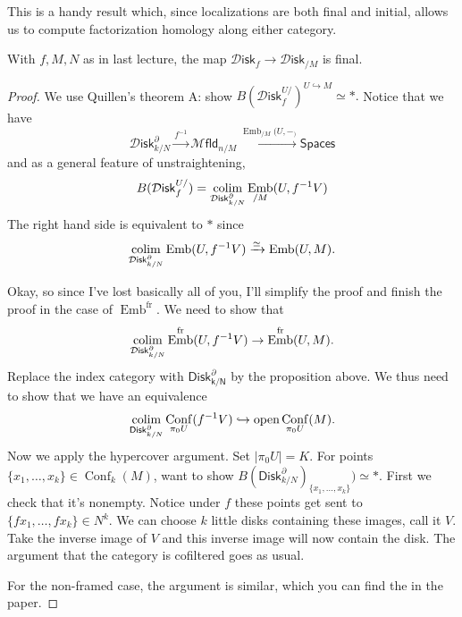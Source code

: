 \documentclass{amsart}
\DeclareMathOperator{\Emb}{Emb}
\DeclareMathOperator{\Conf}{Conf}
\begin{document}
This is a handy result which, since localizations are both final and initial,
allows us to compute factorization homology along either category.
\begin{lemma}[AF 3.21]
    With $f,M,N$ as in last lecture, the map $\mathcal{D}\mathsf{isk}_f\to\mathcal{D}\mathsf{isk}_{/M}$ is final.
\end{lemma}
\begin{proof}
    We use Quillen's theorem A: show $B(\mathcal{D}\mathsf{isk}_f^{U/})^{U\hookrightarrow M}\simeq *.$
    Notice that we have
    \begin{equation*}
        \mathcal{D}\mathsf{isk}_{k/N}^\partial \xrightarrow{f^{-1}} \mathcal{M}\mathsf{fld}_{n/M} \xrightarrow{\Emb_{/M}(U,-_)} \mathsf{Spaces}
    \end{equation*}
    and as a general feature of unstraightening,
    \begin{equation*}
        B(\mathcal{D}\mathsf{isk}_f^{U/}) = \colim_{\mathcal{D}\mathsf{isk}_{k/N}^\partial} \Emb_{/M}(U, f^{-1}V)
    \end{equation*}
    The right hand side is equivalent to $*$ since
    \begin{equation*}
        \colim_{\mathcal{D}\mathsf{isk}_{k/N}^\partial} \Emb(U, f^{-1}V) \xrightarrow{\simeq} \Emb(U,M).
    \end{equation*}

    Okay, so since I've lost basically all of you, I'll simplify the proof and finish the proof in the case of $\Emb^\text{fr}$.
    We need to show that
    \begin{equation*}
        \colim_{\mathcal{D}\mathsf{isk}_{k/N}^\partial} \Emb^\text{fr}(U, f^{-1}V)\to \Emb^\text{fr}(U,M).
    \end{equation*}
    Replace the index category with $\mathsf{Disk_{k/N}^\partial}$ by the proposition above. We thus need
    to show that we have an equivalence
    \begin{equation*}
        \colim_{\mathsf{Disk}_{k/N}^\partial} \Conf_{\pi_0U}(f^{-1}V)\hookrightarrow{\text{open}} \Conf_{\pi_0U}(M).
    \end{equation*}
    Now we apply the hypercover argument. Set $|\pi_0U|=K$. For points $\{x_1,\ldots,x_k\}\in\Conf_k(M)$,
    want to show $B(\mathsf{Disk}_{k/N}^\partial)_{\{x_1,\ldots,x_k\}})\simeq*$. First we check that it's
    nonempty. Notice under $f$ these points get sent to $\{fx_1,\ldots,fx_k\}\in N^k$. We can choose $k$
    little disks containing these images, call it $V$. Take the inverse image of $V$ and this inverse image
    will now contain the disk. The argument that the category is cofiltered goes as usual.

    For the non-framed case, the argument is similar, which you can find the in the paper.
\end{proof}
\end{document}
